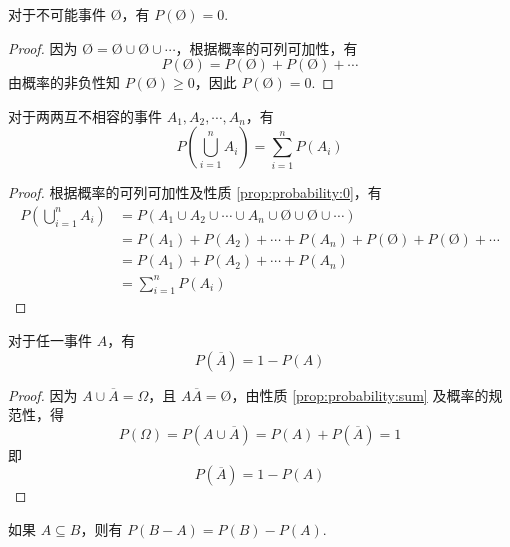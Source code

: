 \begin{property}
    \indent 对于不可能事件 $\text{\O}$，有 $P(\text{\O})=0$.
\end{property}

\begin{proof}
    因为 $\text{\O} = \text{\O} \cup \text{\O} \cup \cdots$，根据概率的可列可加性，有
    $$
    P(\text{\O}) = P(\text{\O}) + P(\text{\O}) + \cdots
    $$
    由概率的非负性知 $P(\text{\O}) \geqslant 0$，因此 $P(\text{\O})=0$.
\end{proof}

\begin{property}
    \indent 对于两两互不相容的事件 $A_1,A_2,\cdots,A_n$，有
    \begin{equation}
        P \left(\bigcup_{i=1}^n A_i \right) = \sum_{i=1}^n P(A_i)
    \end{equation}
\end{property}

\begin{proof}
    根据概率的可列可加性及性质 \ref{prop:probability:0}，有
    $$
    \begin{aligned}
        P \left(\bigcup_{i=1}^n A_i \right) &= P(A_1 \cup A_2 \cup \cdots \cup A_n \cup \text{\O} \cup \text{\O} \cup \cdots) \\
        &= P(A_1) + P(A_2) + \cdots + P(A_n) + P(\text{\O}) + P(\text{\O}) + \cdots \\
        &= P(A_1) + P(A_2) + \cdots + P(A_n) \\
        &= \sum_{i=1}^n P(A_i)
    \end{aligned}
    $$
\end{proof}

\begin{property}
    \indent 对于任一事件 $A$，有
    \begin{equation}
        P(\overline{A})=1-P(A)
    \end{equation}
\end{property}

\begin{proof}
    因为 $A \cup \overline{A} = \varOmega$，且 $A \overline{A} = \text{\O}$，由性质 \ref{prop:probability:sum} 及概率的规范性，得
    $$
    P(\varOmega) = P(A \cup \overline{A}) = P(A) + P(\overline{A}) = 1
    $$
    即
    \[
    P(\overline{A})=1-P(A)
    \]
\end{proof}

\begin{property}
    \indent 如果 $A \subseteq B$，则有 $P(B-A)=P(B)-P(A)$.
\end{property}

